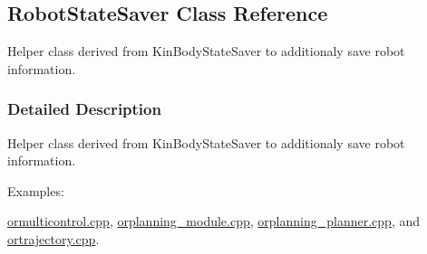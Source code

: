 \hypertarget{classOpenRAVE_1_1RobotBase_1_1RobotStateSaver}{
\subsection{RobotStateSaver Class Reference}
\label{classOpenRAVE_1_1RobotBase_1_1RobotStateSaver}
}


Helper class derived from KinBodyStateSaver to additionaly save robot information.  




\subsubsection{Detailed Description}
Helper class derived from KinBodyStateSaver to additionaly save robot information. \begin{Desc}
\item[Examples: ]\par


\hyperlink{ormulticontrol_8cpp-example}{ormulticontrol.cpp}, \hyperlink{orplanning__module_8cpp-example}{orplanning\_\-module.cpp}, \hyperlink{orplanning__planner_8cpp-example}{orplanning\_\-planner.cpp}, and \hyperlink{ortrajectory_8cpp-example}{ortrajectory.cpp}.

\end{Desc}
